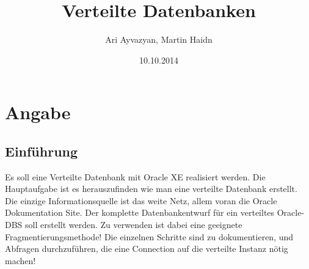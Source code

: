 \documentclass[12pt,a4paper]{article}
\date{10.10.2014}
\author{Ari Ayvazyan, Martin Haidn}
\title{Verteilte Datenbanken}
\begin{document}
\maketitle
\tableofcontents
\newpage
	\section{Angabe}
		\subsection{Einführung}	
			Es soll eine Verteilte Datenbank mit Oracle XE realisiert werden. Die Hauptaufgabe ist es herauszufinden wie man eine verteilte Datenbank erstellt. Die einzige Informationsquelle ist das weite Netz, allem voran die Oracle Dokumentation Site. Der komplette Datenbankentwurf für ein
			verteiltes Oracle-DBS soll erstellt werden. Zu verwenden ist dabei eine geeignete
			Fragmentierungsmethode! Die einzelnen Schritte sind zu dokumentieren, und Abfragen
			durchzuführen, die eine Connection auf die verteilte Instanz nötig machen!
\end{document}

